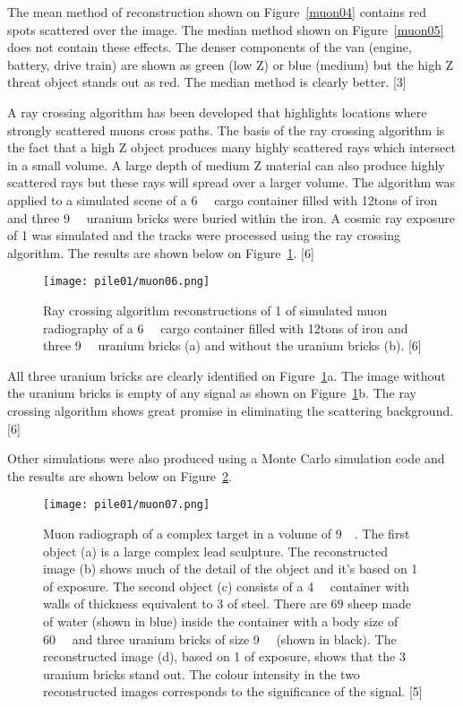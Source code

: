 \documentclass[twocolumn,a4paper]{article}
\begin{document}
The mean method of reconstruction shown on Figure~\ref{muon04} contains red spots scattered over the image.
The median method shown on Figure~\ref{muon05} does not contain these effects. The denser components of
the van (engine, battery, drive train) are shown as green (low Z) or blue (medium) but the high Z
threat object stands out as red. The median method is clearly better. [3]

A ray crossing algorithm has been developed that highlights locations where strongly scattered
muons cross paths. The basis of the ray crossing algorithm is the fact that a high Z object produces
many highly scattered rays which intersect in a small volume. A large depth of medium Z material
can also produce highly scattered rays but these rays will spread over a larger volume. The algorithm
was applied to a simulated scene of a \unit{6}{\cubic\metre} cargo container filled with \unit{12}{tons} of iron and
three \unit{9}{\cubic{\centi\metre}} uranium bricks were buried within the iron. A cosmic ray exposure of \unit{1}{\minute} was
simulated and the tracks were processed using the ray crossing algorithm. The results are shown
below on Figure~\ref{muon06}. [6]

\begin{figure}
  \texttt{[image: pile01/muon06.png]}
  \caption{Ray crossing algorithm reconstructions of \unit{1}{\minute} of simulated muon radiography of a
\unit{6}{\cubic\metre} cargo container filled with \unit{12}{tons} of iron and
three \unit{9}{\cubic{\centi\metre}} uranium bricks (a) and without the uranium bricks (b). [6]}
  \label{muon06}
\end{figure}

All three uranium bricks are clearly identified on Figure~\ref{muon06}a. The image without the uranium bricks is
empty of any signal as shown on Figure~\ref{muon06}b. The ray crossing algorithm shows great promise in
eliminating the scattering background. [6]

Other simulations were also produced using a Monte Carlo simulation code and the results are
shown below on Figure~\ref{muon07}.

\begin{figure}
  \texttt{[image: pile01/muon07.png]}
  \caption{Muon radiograph of a complex target in a volume of \unit{9}{\cubic\metre}. The first object (a) is a
large complex lead sculpture. The reconstructed image (b) shows much of the detail of the object
and it’s based on \unit{1}{\minute} of exposure. The second object (c) consists of a \unit{4}{\cubic\metre} container with
walls of thickness equivalent to \unit{3}{\milli\metre} of steel. There are 69 sheep made of water (shown in blue)
inside the container with a body size of \unit{60}{\cubic{\centi\metre}} and three uranium bricks of 
size \unit{9}{\cubic{\centi\metre}} (shown in black). The reconstructed image (d), based 
on \unit{1}{\minute} of exposure, shows that the 3 uranium bricks stand out. The colour intensity in the two reconstructed 
images corresponds to the significance of the signal. [5]}
  \label{muon07}
\end{figure}
\end{document}
